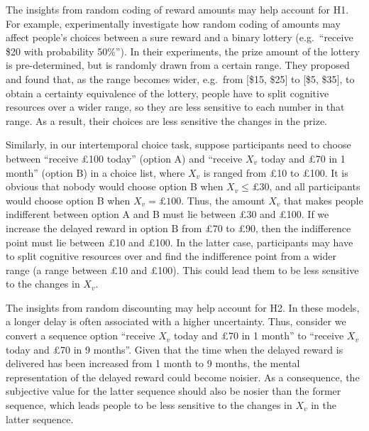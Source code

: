 \documentclass[
  12pt,
]{article}
\begin{document}
The insights from random coding of reward amounts may help account for
H1. For example, \citet{frydman2022efficient} experimentally investigate
how random coding of amounts may affect people's choices between a sure
reward and a binary lottery (e.g.~``receive \$20 with probability
50\%''). In their experiments, the prize amount of the lottery is
pre-determined, but is randomly drawn from a certain range. They
proposed and found that, as the range becomes wider, e.g.~from {[}\$15,
\$25{]} to {[}\$5, \$35{]}, to obtain a certainty equivalence of the
lottery, people have to split cognitive resources over a wider range, so
they are less sensitive to each number in that range. As a result, their
choices are less sensitive the changes in the prize.

Similarly, in our intertemporal choice task, suppose participants need
to choose between ``receive £100 today'' (option A) and ``receive
\(X_v\) today and £70 in 1 month'' (option B) in a choice list, where
\(X_v\) is ranged from £10 to £100. It is obvious that nobody would
choose option B when \(X_v \leq £30\), and all participants would choose
option B when \(X_v=£100\). Thus, the amount \(X_v\) that makes people
indifferent between option A and B must lie between £30 and £100. If we
increase the delayed reward in option B from £70 to £90, then the
indifference point must lie between £10 and £100. In the latter case,
participants may have to split cognitive resources over and find the
indifference point from a wider range (a range between £10 and £100).
This could lead them to be less sensitive to the changes in \(X_v\).

The insights from random discounting may help account for H2. In these
models, a longer delay is often associated with a higher uncertainty.
Thus, consider we convert a sequence option ``receive \(X_v\) today and
£70 in 1 month'' to ``receive \(X_v\) today and £70 in 9 months''. Given
that the time when the delayed reward is delivered has been increased
from 1 month to 9 months, the mental representation of the delayed
reward could become noisier. As a consequence, the subjective value for
the latter sequence should also be nosier than the former sequence,
which leads people to be less sensitive to the changes in \(X_v\) in the
latter sequence.
\end{document}

